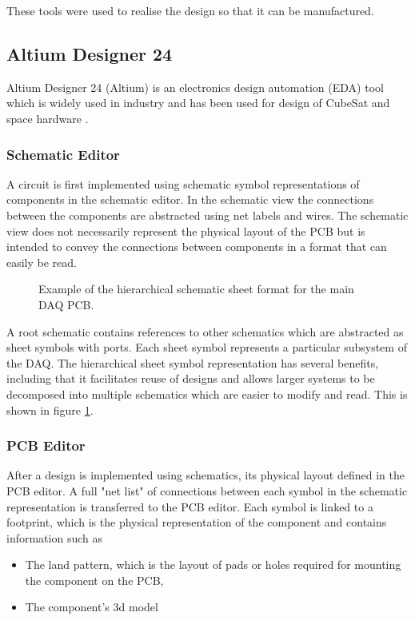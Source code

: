 \documentclass{report}
\begin{document}
These tools were used to realise the design so that it can be manufactured.

\subsection{Altium Designer 24}

Altium Designer 24 (Altium) is an electronics design automation (EDA) tool which is widely used in industry and has been used for design of CubeSat and space hardware \cite{10061409}.

\subsubsection{Schematic Editor}
\label{sec:schematic-editor}
A circuit is first implemented using schematic symbol representations of components in the schematic editor. In the schematic view the connections between the components are abstracted using net labels and wires. The schematic view does not necessarily represent the physical layout of the PCB but is intended to convey the connections between components in a format that can easily be read.

\begin{figure}[H]
  \centering
  
  \caption{Example of the hierarchical schematic sheet format for the main DAQ PCB.}
  \label{fig:altium-schematic-hierarchical}
\end{figure}

A root schematic contains references to other schematics which are abstracted as sheet symbols with ports. Each sheet symbol represents a particular subsystem of the DAQ. The hierarchical sheet symbol representation has several benefits, including that it facilitates reuse of designs and allows larger systems to be decomposed into multiple schematics which are easier to modify and read. This is shown in figure \ref{fig:altium-schematic-hierarchical}.

\subsubsection{PCB Editor}
\label{sec:pcb-editor}
After a design is implemented using schematics, its physical layout defined in the PCB editor.
A full "net list" of connections between each symbol in the schematic representation is transferred to the PCB editor. Each symbol is linked to a footprint, which is the physical representation of the component and contains information such as
\begin{itemize}
  \item The land pattern, which is the layout of pads or holes required for mounting the component on the PCB,
  \item The component's 3d model
\end{itemize}
\end{document}
